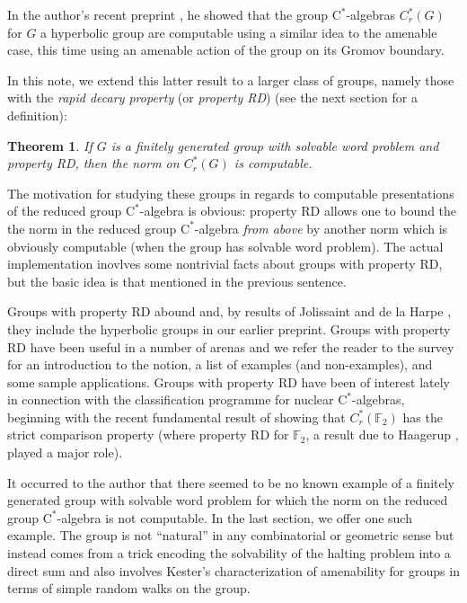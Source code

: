 \documentclass{amsart}
\newcommand{\cstar}{$\mathrm{C}^*$}
\theoremstyle{plain}
\newtheorem{theorem}{Theorem}[section]
\theoremstyle{definition}
\numberwithin{equation}{section}
\begin{document}
In the author's recent preprint \cite{goldbring}, he showed that the group \cstar-algebras $C^*_r(G)$ for $G$ a hyperbolic group are computable using a similar idea to the amenable case, this time using an amenable action of the group on its Gromov boundary.

In this note, we extend this latter result to a larger class of groups, namely those with the \emph{rapid decary property} (or \emph{property RD}) (see the next section for a definition):

\begin{theorem}
If $G$ is a finitely generated group with solvable word problem and property RD, then the norm on $C^*_r(G)$ is computable.
\end{theorem}

The motivation for studying these groups in regards to computable presentations of the reduced group \cstar-algebra is obvious:  property RD allows one to bound the the norm in the reduced group \cstar-algebra \emph{from above} by another norm which is obviously computable (when the group has solvable word problem).  The actual implementation inovlves some nontrivial facts about groups with property RD, but the basic idea is that mentioned in the previous sentence.  

Groups with property RD abound and, by results of Jolissaint \cite{jolissaint} and de la Harpe \cite{DLH}, they include the hyperbolic groups in our earlier preprint.  Groups with property RD have been useful in a number of arenas and we refer the reader to the survey \cite{chatterji} for an introduction to the notion, a list of examples (and non-examples), and some sample applications.  Groups with property RD have been of interest lately in connection with the classification programme for nuclear \cstar-algebras, beginning with the recent fundamental result of \cite{strict} showing that $C^*_r(\mathbb{F}_2)$ has the strict comparison property (where property RD for $\mathbb{F}_2$, a result due to Haagerup \cite{haagerup}, played a major role).

It occurred to the author that there seemed to be no known example of a finitely generated group with solvable word problem for which the norm on the reduced group \cstar-algebra is not computable.  In the last section, we offer one such example.  The group is not ``natural'' in any combinatorial or geometric sense but instead comes from a trick encoding the solvability of the halting problem into a direct sum and also involves Kester's characterization of amenability for groups in terms of simple random walks on the group.
\end{document}
